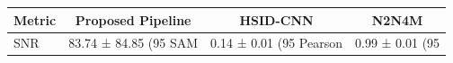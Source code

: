\begin{table}[h]
\centering
\begin{tabular}{lccc}
\hline
Metric & Proposed Pipeline & HSID-CNN & N2N4M \\
\hline
SNR & 83.74 ± 84.85 (95%
SAM & 0.14 ± 0.01 (95%
Pearson & 0.99 ± 0.01 (95%
\hline
\end{tabular}
\end{table}